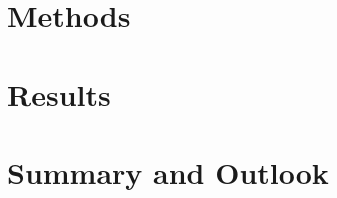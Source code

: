 \documentclass[a4paper, 12pt]{article}
\begin{document}
\section{Methods} \label{sec:methods}
\section{Results} \label{sec:results}
\section{Summary and Outlook} \label{sec:summary}

\clearpage
\sloppy
\printbibliography
\end{document}
